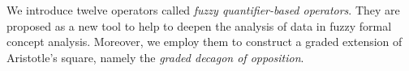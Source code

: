 
We introduce twelve operators called \emph{fuzzy quantifier-based operators}. They are proposed as a new tool to help to deepen the analysis of data in fuzzy formal concept analysis. 
 Moreover, we employ them to construct a graded extension of Aristotle's square, namely the \emph{graded decagon of opposition}.
%

